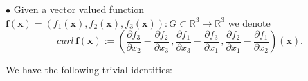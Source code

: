 \documentclass{article}
\theoremstyle{definition}
\theoremstyle{remark}
\renewcommand{\O}{\Omega}
\renewcommand{\vec}[1]{\mathbf{#1}}
\newcommand{\R}{\mathbb{R}}
\renewcommand{\O}{\Omega}
\renewcommand{\O}{\Omega}
\newcommand{\R}{{\mathbb{R}}}
\begin{document}
\noindent$\bullet$ Given a vector valued function $\vec f(\vec
x)=\left(f_1(\vec x),f_2(\vec x),f_3(\vec
x)\right):G\subset\R^3\to\R^3$
we denote
$$curl\,\vec f(\vec x):=\left(\frac{\partial f_3}{\partial x_2}-\frac{\partial f_2}{\partial x_3}\,,
\frac{\partial f_1}{\partial x_3}-\frac{\partial f_3}{\partial
x_1}\,,\frac{\partial f_2}{\partial x_1}-\frac{\partial
f_1}{\partial x_2}\right)(\vec x).$$
%
%
%
%
%
\begin{comment}
\item Given a
matrix valued function $F(\vec x)=\left\{f_{ij}(\vec
x)\right\}(1\leq i\leq p,\,1\leq j\leq q):\O\to\R^{p\times q}$
($\O\subset\R^N$) we denote by $DF$ or by $\nabla_{\vec x} F$ the
$p\times q\times N$ tensor with $ijk$-th entry $\frac{\partial
f_{ij}}{\partial x_k}$.
\item For every dimension $d$
we denote by $I$ the unit $d\times d$-matrix and by $O$ the null
$d\times d$-matrix.
\item Given a vector valued
measure $\mu=(\mu_1,\ldots,\mu_k)$ (where for any $1\leq j\leq k$,
$\mu_j$ is a finite signed measure) we denote by $\|\mu\|(E)$ its
total variation measure of the set $E$.
\item For any $\mu$-measurable function $f$, we define the product measure
$f\cdot\mu$ by: $f\cdot\mu(E)=\int_E f\,d\mu$, for every
$\mu$-measurable set $E$.
\item Throughout this paper we assume that
$\O\subset\R^N$ is an open set.
\end{comment}
%
%
%
%
%
We have the following trivial identities:
%
%
%
%
\end{document}
